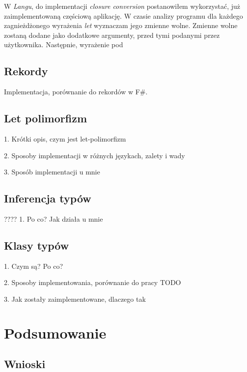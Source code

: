 \documentclass[declaration,shortabstract]{iithesis}
\begin{document}
W \textit{Langu}, do implementacji \textit{closure conversion} postanowiłem wykorzystać,
już zaimplementowaną częściową aplikację. W czasie analizy programu dla każdego 
zagnieżdżonego wyrażenia \textit{let} wyznaczam jego zmienne wolne. Zmienne wolne
zostaną dodane jako dodatkowe argumenty, przed tymi podanymi przez użytkownika.
Następnie, wyrażenie pod 




\section{Rekordy}

Implementacja, porównanie do rekordów w F\#.

\section{Let polimorfizm}

1. Krótki opis, czym jest let-polimorfizm

2. Sposoby implementacji w różnych językach, zalety i wady 

3. Sposób implementacji u mnie

\section{Inferencja typów}
????
1. Po co? Jak działa u mnie

\section{Klasy typów}

1. Czym są? Po co? 

2. Sposoby implementowania, porównanie do pracy TODO

3. Jak zostały zaimplementowane, dlaczego tak

\chapter{Podsumowanie}

\section{Wnioski}
\end{document}
